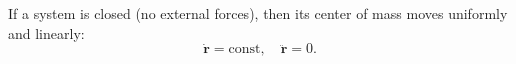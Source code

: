If a system is closed (no external forces), then its center of mass moves uniformly and linearly:
$$\dot{\mathbf{r}} = \text{const}, \quad \ddot{\mathbf{r}} = 0.$$
